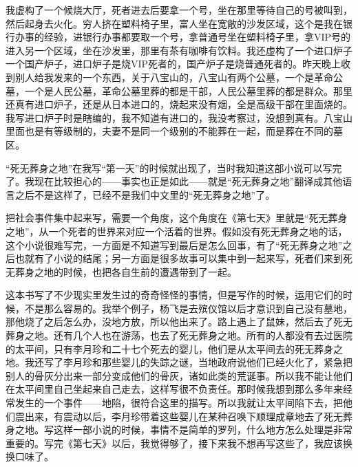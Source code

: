 \documentclass[fontset=fandol,12pt,a5paper]{ctexbook}
\begin{document}
我虚构了一个候烧大厅，死者进去后要拿一个号，坐在那里等待自己的号被叫到，然后起身去火化。穷人挤在塑料椅子里，富人坐在宽敞的沙发区域，这个是我在银行办事的经验，进银行办事都要取一个号，拿普通号坐在塑料椅子里，拿VIP号的进入另一个区域，坐在沙发里，那里有茶有咖啡有饮料。我还虚构了一个进口炉子一个国产炉子，进口炉子是烧VIP死者的，国产炉子是烧普通死者的。昨天晚上收到别人给我发来的一个东西，关于八宝山的，八宝山有两个公墓，一个是革命公墓，一个是人民公墓，革命公墓里葬的都是干部，人民公墓里葬的都是群众。那里还真有进口炉子，还是从日本进口的，烧起来没有烟，全是高级干部在里面烧的。我写进口炉子时是瞎编的，我不知道有进口的，我没考察过，没想到真有。八宝山里面也是有等级制的，夫妻不是同一个级别的不能葬在一起，而是葬在不同的墓区。

“死无葬身之地”在我写“第一天”的时候就出现了，当时我知道这部小说可以写完了。我现在比较担心的——事实也正是如此——就是“死无葬身之地”翻译成其他语言之后不是这样了，已经不是我们中文里的“死无葬身之地”了。

把社会事件集中起来写，需要一个角度，这个角度在《第七天》里就是“死无葬身之地”，从一个死者的世界来对应一个活着的世界。假如没有死无葬身之地的话，这个小说很难写完，一方面是不知道写到最后是怎么回事，有了“死无葬身之地”之后也就有了小说的结尾；另一方面是很多故事可以集中到一起来写，死者们来到死无葬身之地的时候，也把各自生前的遭遇带到了一起。

这本书写了不少现实里发生过的奇奇怪怪的事情，但是写作的时候，运用它们的时候，不是那么容易的。我举个例子，杨飞是去殡仪馆以后才意识到自己没有墓地，那他烧了之后怎么办，没地方放，所以他出来了。路上遇上了鼠妹，然后去了死无葬身之地。还有几个人也在游荡，也去了死无葬身之地。所有的人都没有去过医院的太平间，只有李月珍和二十七个死去的婴儿，他们是从太平间去的死无葬身之地。我还写了李月珍和那些婴儿的失踪之谜，当地政府说他们已经火化了，紧急把别人的骨灰分出来一部分变成他们的骨灰，诸如此类的荒诞事。所以我不能让他们在太平间里自己坐起来自己走去，这样写很不负责任。那时候我想到那么多年来经常发生的一个事件——地陷，很符合这里的描写。所以我就让太平间陷下去，把他们震出来，有震动以后，李月珍带着这些婴儿在某种召唤下顺理成章地去了死无葬身之地。写这样一部小说的时候，事情不是简单的罗列，什么地方怎么处理是非常重要的。写完《第七天》以后，我觉得够了，接下来我不想再写这些了，我应该换换口味了。
\end{document}
